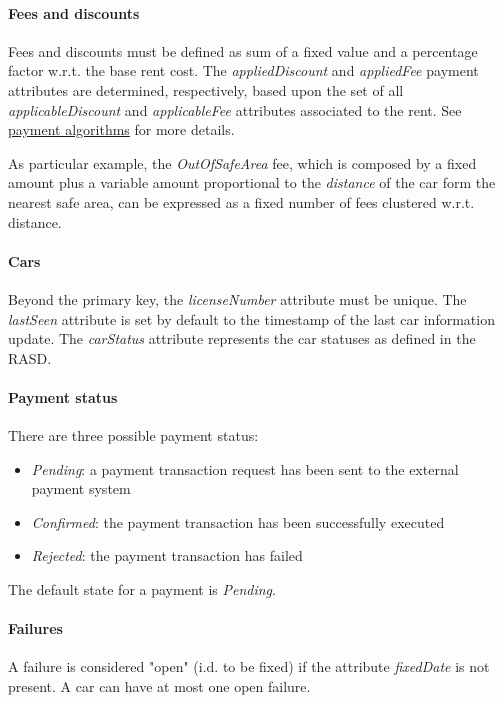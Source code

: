 \paragraph{Fees and discounts}
Fees and discounts must be defined as sum of a fixed value and a percentage factor w.r.t. the base rent cost.
The \emph{appliedDiscount} and \emph{appliedFee} payment attributes are determined, respectively, based upon the set of all \emph{applicableDiscount} and \emph{applicableFee} attributes associated to the rent. See \hyperref[sec:paymentAlgorithms]{payment algorithms} for more details.

As particular example, the \emph{OutOfSafeArea} fee, which is composed by a fixed amount plus a variable amount proportional to the \emph{distance} of the car form the nearest safe area, can be expressed as a fixed number of fees clustered w.r.t. distance.

\paragraph{Cars}Beyond the primary key, the \mbox{\emph{licenseNumber}} attribute must be unique. The \mbox{\emph{lastSeen}} attribute is set by default to the timestamp of the last car information update. The \mbox{\emph{carStatus}} attribute represents the car statuses as defined in the RASD.

\paragraph{Payment status} There are three possible payment status:
\begin{itemize}
	\item \emph{Pending}: a payment transaction request has been sent to the external payment system
	\item \emph{Confirmed}: the payment transaction has been successfully executed
	\item \emph{Rejected}: the payment transaction has failed
\end{itemize}
The default state for a payment is \emph{Pending}.

\paragraph{Failures}A failure is considered "open" (i.d. to be fixed) if the attribute \emph{fixedDate} is not present. A car can have at most one open failure.

